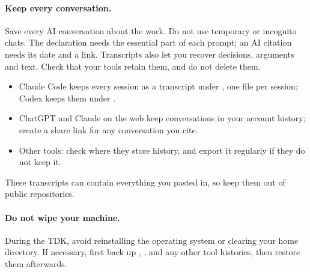 \paragraph{Keep every conversation.} Save every AI conversation about the work. Do not use temporary or incognito chats. The declaration needs the essential part of each prompt; an AI citation needs its date and a link. Transcripts also let you recover decisions, arguments and text. Check that your tools retain them, and do not delete them.
\begin{itemize}[noitemsep]
  \item Claude Code keeps every session as a transcript under , one file per session; Codex keeps them under .
  \item ChatGPT and Claude on the web keep conversations in your account history; create a share link for any conversation you cite.
  \item Other tools: check where they store history, and export it regularly if they do not keep it.
\end{itemize}
These transcripts can contain everything you pasted in, so keep them out of public repositories.

\paragraph{Do not wipe your machine.} During the TDK, avoid reinstalling the operating system or clearing your home directory. If necessary, first back up , ,  and any other tool histories, then restore them afterwards.

